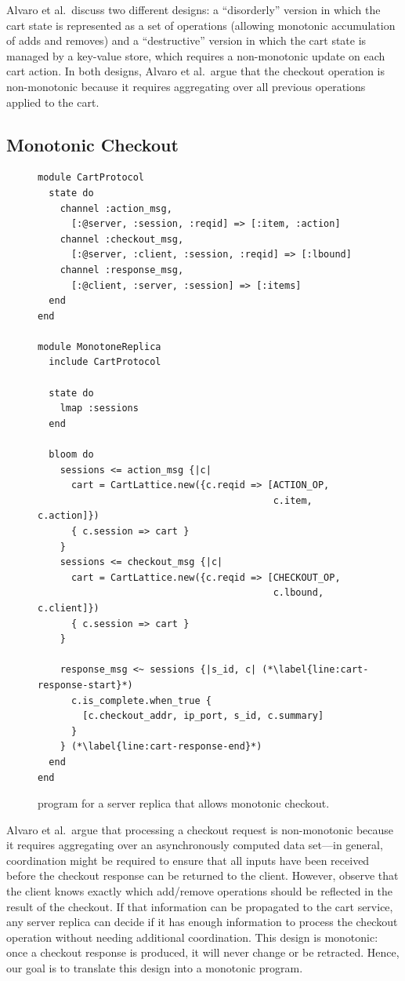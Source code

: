 Alvaro et al.\ discuss two different designs: a ``disorderly'' version in which
the cart state is represented as a set of operations (allowing monotonic
accumulation of adds and removes) and a ``destructive'' version in which the
cart state is managed by a key-value store, which requires a non-monotonic
update on each cart action. In both designs, Alvaro et al.\ argue that the
checkout operation is non-monotonic because it requires aggregating over all
previous operations applied to the cart.

\subsection{Monotonic Checkout}
\begin{figure}[t]
\begin{scriptsize}

\begin{lstlisting}
module CartProtocol
  state do
    channel :action_msg,
      [:@server, :session, :reqid] => [:item, :action]
    channel :checkout_msg,
      [:@server, :client, :session, :reqid] => [:lbound]
    channel :response_msg,
      [:@client, :server, :session] => [:items]
  end
end

module MonotoneReplica
  include CartProtocol

  state do
    lmap :sessions
  end

  bloom do
    sessions <= action_msg {|c|
      cart = CartLattice.new({c.reqid => [ACTION_OP,
                                          c.item, c.action]})
      { c.session => cart }
    }
    sessions <= checkout_msg {|c|
      cart = CartLattice.new({c.reqid => [CHECKOUT_OP,
                                          c.lbound, c.client]})
      { c.session => cart }
    }

    response_msg <~ sessions {|s_id, c| (*\label{line:cart-response-start}*)
      c.is_complete.when_true {
        [c.checkout_addr, ip_port, s_id, c.summary]
      }
    } (*\label{line:cart-response-end}*)
  end
end
\end{lstlisting}
\end{scriptsize}
\caption{\lang program for a server replica that allows monotonic checkout.}
\label{fig:monotone-cart}
\end{figure}

Alvaro et al.\ argue that processing a checkout request is non-monotonic because
it requires aggregating over an asynchronously computed data set---in general,
coordination might be required to ensure that all inputs have been received
before the checkout response can be returned to the client. However, observe
that the client knows exactly which add/remove operations should be reflected in
the result of the checkout. If that information can be propagated to the cart
service, any server replica can decide if it has enough information to process
the checkout operation without needing additional coordination. This design is
monotonic: once a checkout response is produced, it will never change or be
retracted. Hence, our goal is to translate this design into a monotonic \lang
program.

